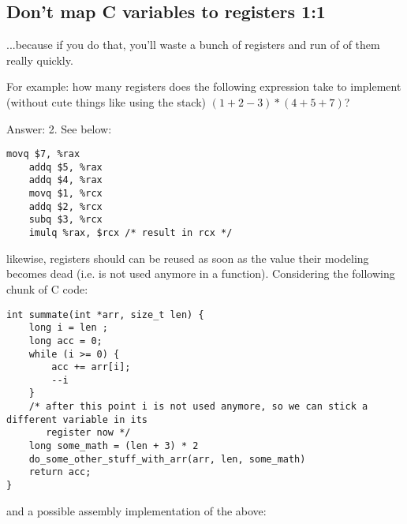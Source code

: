 \documentclass[11pt]{article}
\begin{document}
\subsection{Don't map C variables to registers 1:1}

...because if you do that, you'll waste a bunch of registers and run of of them really
quickly.

For example: how many registers does the following expression take to implement (without
cute things like using the stack) $(1+2-3)*(4+5+7)$?

Answer: 2. See below:

\begin{lstlisting}[caption={An assembly implementation of $(1+2-3)*(4+5+7)$}, captionpos=b]
    movq $7, %rax
    addq $5, %rax
    addq $4, %rax
    movq $1, %rcx
    addq $2, %rcx
    subq $3, %rcx
    imulq %rax, $rcx /* result in rcx */
\end{lstlisting}

likewise, registers should can be reused as soon as the value their modeling becomes dead
(i.e. is not used anymore in a function). Considering the following chunk of C code:

\begin{lstlisting}[caption={C example for register allocation}, captionpos=b]
int summate(int *arr, size_t len) {
    long i = len ;
    long acc = 0;
    while (i >= 0) {
        acc += arr[i];
        --i
    }
    /* after this point i is not used anymore, so we can stick a different variable in its
       register now */
    long some_math = (len + 3) * 2
    do_some_other_stuff_with_arr(arr, len, some_math)
    return acc;
}
\end{lstlisting}

and a possible assembly implementation of the above:
\end{document}
